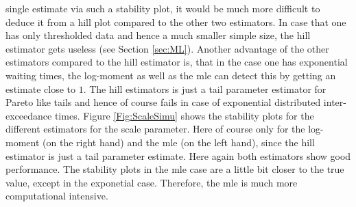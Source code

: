 \documentclass[]{elsarticle} %
\begin{document}
single estimate via such a stability plot, it would be much more
difficult to deduce it from a hill plot compared to the other two
estimators. In case that one has only thresholded data and hence a much
smaller simple size, the hill estimator gets useless (see Section
\ref{sec:ML}). Another advantage of the other estimators compared to the
hill estimator is, that in the case one has exponential waiting times,
the log-moment as well as the mle can detect this by getting an estimate
close to \(1\). The hill estimators is just a tail parameter estimator
for Pareto like tails and hence of course fails in case of exponential
distributed inter-exceedance times. Figure \ref{Fig:ScaleSimu} shows the
stability plots for the different estimators for the scale parameter.
Here of course only for the log-moment (on the right hand) and the mle
(on the left hand), since the hill estimator is just a tail parameter
estimate. Here again both estimators show good performance. The
stability plots in the mle case are a little bit closer to the true
value, except in the exponetial case. Therefore, the mle is much more
computational intensive.
\end{document}
